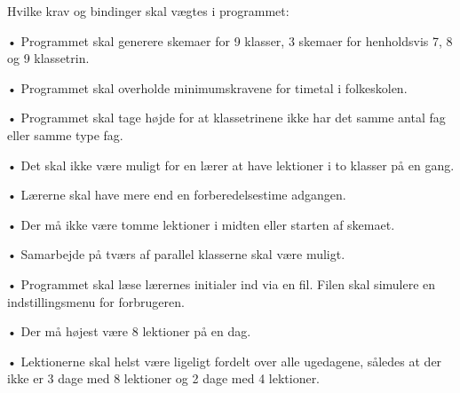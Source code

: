 Hvilke krav og bindinger skal vægtes i programmet:


•	Programmet skal generere skemaer for 9 klasser, 3 skemaer for henholdsvis 7, 8 og 9 klassetrin.


•	Programmet skal overholde minimumskravene for timetal i folkeskolen.


•	Programmet skal tage højde for at klassetrinene ikke har det samme antal fag eller samme type fag.


•	Det skal ikke være muligt for en lærer at have lektioner i to klasser på en gang.


•	Lærerne skal have mere end en forberedelsestime adgangen.


•	Der må ikke være tomme lektioner i midten eller starten af skemaet.


•	Samarbejde på tværs af parallel klasserne skal være muligt. 


•	Programmet skal læse lærernes initialer ind via en fil. Filen skal simulere en indstillingsmenu for forbrugeren.


•	Der må højest være 8 lektioner på en dag.


•	Lektionerne skal helst være ligeligt fordelt over alle ugedagene, således at der ikke er 3 dage med 8 lektioner og 2 dage med 4 lektioner.
